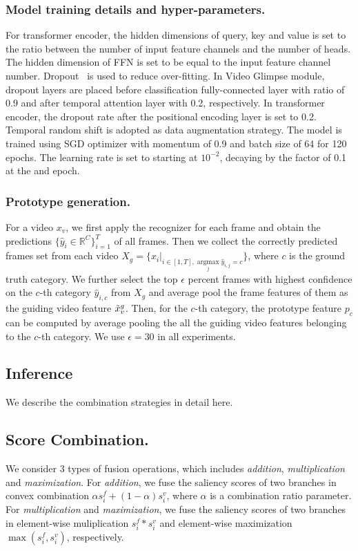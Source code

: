 \documentclass[runningheads]{llncs}
\begin{document}
\subsubsection{Model training details and hyper-parameters.}
For transformer encoder, the hidden dimensions of query, key and value is set to the ratio between the number of input feature channels and the number of heads. The hidden dimension of FFN is set to be equal to the input feature channel number. Dropout~\cite{dropout} is used to reduce over-fitting. In Video Glimpse module, dropout layers are placed before classification fully-connected layer with ratio of 0.9 and after temporal attention layer with 0.2, respectively. In transformer encoder, the dropout rate after the positional encoding layer is set to 0.2. Temporal random shift is adopted as data augmentation strategy. The model is trained using SGD optimizer with momentum of 0.9 and batch size of 64 for 120 epochs. The learning rate is set to starting at $10^{-2}$, decaying by the factor of 0.1 at the  and  epoch. 

\subsubsection{Prototype generation.}
For a video $x_v$, we first apply the recognizer for each frame and obtain the predictions $\{\hat{y}_i\in\mathbb{R}^C\}_{i=1}^T$ of all frames. Then we collect the correctly predicted frames set from each video $X_g=\{x_i |_{i\in [1,T],\underset{j}{\operatorname{argmax}} \hat{y}_{i,j}=c}\}$, where $c$ is the ground truth category. We further select the top $\epsilon$ percent frames with highest confidence on the $c$-th category $\hat{y}_{i,c}$ from $X_g$ and average pool the frame features of them as the guiding video feature $\Tilde{x}^g_v$. Then, for the $c$-th category, the prototype feature $p_c$ can be computed by average pooling the all the guiding video features belonging to the $c$-th category. We use  $\epsilon=30$ in all experiments. 


\subsection{Inference} \label{appendix:test_details}
We describe the combination strategies in detail here.

\subsection{Score Combination.}
We consider 3 types of fusion operations, which includes \textit{addition}, \textit{multiplication} and \textit{maximization}. For \textit{addition}, we fuse the saliency scores of two branches in convex combination $\alpha {s}^{f}_{i} + (1-\alpha){s}^{v}_{i} $, where $\alpha$ is a combination ratio parameter. For \textit{multiplication} and \textit{maximization}, we fuse the saliency scores of two branches in element-wise muliplication ${s}^{f}_{i} * {s}^{v}_{i}$ and element-wise maximization $\max({s}^{f}_{i}, {s}^{v}_{i})$, respectively. 
\end{document}
